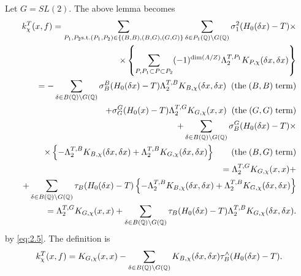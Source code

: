 \begin{example}\label{ex:5.16}
Let $G=SL(2)$. The above lemma becomes 
\begin{eqnarray*}
k_\chi ^T(x,f)=
\sum_{ P_1,P_2 {\rm s.t.} (P_1,P_2)\in  \{(B,B),(B,G),(G,G)\}} 
\sum_{\delta \in P_1(\qqq )\backslash G(\qqq )}
\sigma_1^2(H_0(\delta x)-T)\times  \\
\ \times \left\{ \sum_{ P , P_1\subset P\subset P_2 }
(-1)^{\dim (A/Z)}\Lambda _2^{T,P_1}K_{P,\chi }(\delta x,\delta x)\right\}  \\
=-\sum_{\delta \in B(\qqq )\backslash G(\qqq )}\sigma _B^B(H_0(\delta
x)-T)\Lambda _2^{T,B}K_{B,\chi }(\delta x,\delta x)\;\;(\mathrm{the}\;(B,B)\;%
\mathrm{term}) \\
+\sigma _G^G(H_0(x)-T)\Lambda _2^{T,G}K_{G,\chi }(x,x)\;\;(\mathrm{the}%
\;(G,G)\;\mathrm{term}) \\
+\sum_{\delta \in B(\qqq )\backslash G(\qqq )}\sigma _B^G(H_0(\delta
x)-T)\times  \\
\;\;\times \left\{ -\Lambda _2^{T,B}K_{B,\chi }(\delta x,\delta x)+\Lambda
_2^{T,B}K_{G,\chi }(\delta x,\delta x)\right\} \;\;\;\;\;\;\;(\mathrm{the}%
\;(B,G)\;\mathrm{term}) \\
=\Lambda _2^{T,G}K_{G,\chi }(x,x)+ \\
+\sum_{\delta \in B(\qqq )\backslash G(\qqq )}\tau _B(H_0(\delta
x)-T)\left\{ -\Lambda _2^{T,B}K_{B,\chi }(\delta x,\delta x)+\Lambda
_2^{T,B}K_{G,\chi }(\delta x,\delta x)\right\}  \\
=\Lambda _2^{T,G}K_{G,\chi }(x,x)+\sum_{\delta \in B(\qqq )\backslash G(%
\qqq )}\tau _B(H_0(\delta x)-T)\Lambda _2^{T,B}K_{G,\chi }(\delta x,\delta
x).
\end{eqnarray*}
by \eqref{eq:2.5}.
The definition is 
\begin{equation}\label{eq:5.18}
k_\chi ^T(x,f)=K_{G,\chi }(x,x)-\sum_{\delta \in B(\qqq )\backslash G(\mathbb{%
Q})}K_{B,\chi }(\delta x,\delta x)\tau _B^{\wedge }(H_0(\delta x)-T).
\end{equation}


\end{example}

